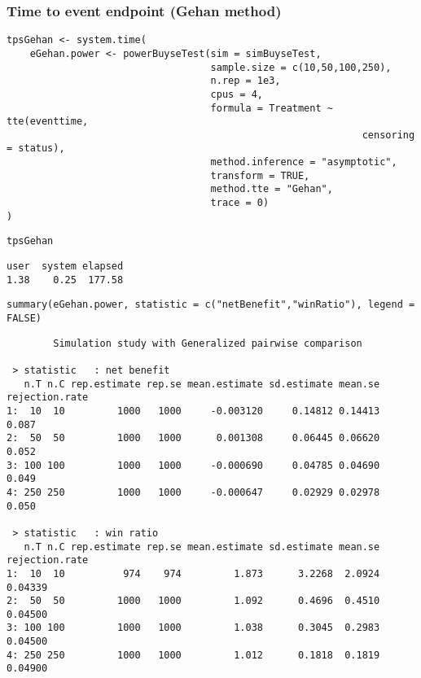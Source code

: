 \documentclass[12pt]{article}
\begin{document}
\clearpage

\subsubsection{Time to event endpoint (Gehan method)}
\label{sec:org58292a1}
\lstset{language=r,label= ,caption= ,captionpos=b,numbers=none}
\begin{lstlisting}
tpsGehan <- system.time(
	eGehan.power <- powerBuyseTest(sim = simBuyseTest, 
								   sample.size = c(10,50,100,250), 
								   n.rep = 1e3,
								   cpus = 4,
								   formula = Treatment ~ tte(eventtime, 
															 censoring = status), 
								   method.inference = "asymptotic",
								   transform = TRUE,
								   method.tte = "Gehan",
								   trace = 0)
)
\end{lstlisting}

\lstset{language=r,label= ,caption= ,captionpos=b,numbers=none}
\begin{lstlisting}
tpsGehan
\end{lstlisting}

\begin{verbatim}
user  system elapsed 
1.38    0.25  177.58
\end{verbatim}

\lstset{language=r,label= ,caption= ,captionpos=b,numbers=none}
\begin{lstlisting}
summary(eGehan.power, statistic = c("netBenefit","winRatio"), legend = FALSE)
\end{lstlisting}

\begin{verbatim}
        Simulation study with Generalized pairwise comparison

 > statistic   : net benefit
   n.T n.C rep.estimate rep.se mean.estimate sd.estimate mean.se rejection.rate
1:  10  10         1000   1000     -0.003120     0.14812 0.14413          0.087
2:  50  50         1000   1000      0.001308     0.06445 0.06620          0.052
3: 100 100         1000   1000     -0.000690     0.04785 0.04690          0.049
4: 250 250         1000   1000     -0.000647     0.02929 0.02978          0.050

 > statistic   : win ratio
   n.T n.C rep.estimate rep.se mean.estimate sd.estimate mean.se rejection.rate
1:  10  10          974    974         1.873      3.2268  2.0924        0.04339
2:  50  50         1000   1000         1.092      0.4696  0.4510        0.04500
3: 100 100         1000   1000         1.038      0.3045  0.2983        0.04500
4: 250 250         1000   1000         1.012      0.1818  0.1819        0.04900
\end{verbatim}
\end{document}
